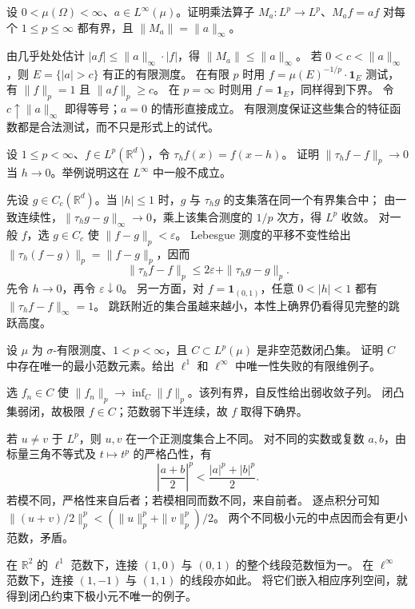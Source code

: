 \begin{exercise}\label{b1:ex:10-multiplication}
设 \(0<\mu(\Omega)<\infty\)、\(a\in L^\infty(\mu)\)。证明乘法算子
\(M_a:L^p\to L^p\)、\(M_af=af\) 对每个 \(1\leq p\leq\infty\) 都有界，且 \(\|M_a\|=\|a\|_\infty\)。
\end{exercise}
\begin{solution}
由几乎处处估计 \(|af|\leq\|a\|_\infty\cdot|f|\)，得 \(\|M_a\|\leq\|a\|_\infty\)。
若 \(0<c<\|a\|_\infty\)，则 \(E=\{|a|>c\}\) 有正的有限测度。
在有限 \(p\) 时用 \(f=\mu(E)^{-1/p}\cdot\mathbf1_E\) 测试，有 \(\|f\|_p=1\) 且 \(\|af\|_p\geq c\)。
在 \(p=\infty\) 时则用 \(f=\mathbf1_E\)，同样得到下界。
令 \(c\uparrow\|a\|_\infty\) 即得等号；\(a=0\) 的情形直接成立。
有限测度保证这些集合的特征函数都是合法测试，而不只是形式上的试代。
\end{solution}

\begin{exercise}\label{b1:ex:10-translation-continuity}
设 \(1\leq p<\infty\)、\(f\in L^p(\mathbb R^d)\)，令 \(\tau_hf(x)=f(x-h)\)。
证明 \(\|\tau_hf-f\|_p\to0\) 当 \(h\to0\)。举例说明这在 \(L^\infty\) 中一般不成立。
\end{exercise}
\begin{solution}
先设 \(g\in C_c(\mathbb R^d)\)。当 \(|h|\leq1\) 时，\(g\) 与 \(\tau_hg\) 的支集落在同一个有界集合中；
由一致连续性，\(\|\tau_hg-g\|_\infty\to0\)，乘上该集合测度的 \(1/p\) 次方，得 \(L^p\) 收敛。
对一般 \(f\)，选 \(g\in C_c\) 使 \(\|f-g\|_p<\varepsilon\)。
Lebesgue 测度的平移不变性给出 \(\|\tau_h(f-g)\|_p=\|f-g\|_p\)，因而
\[
 \|\tau_hf-f\|_p\leq2\varepsilon+\|\tau_hg-g\|_p.
\]
先令 \(h\to0\)，再令 \(\varepsilon\downarrow0\)。
另一方面，对 \(f=\mathbf1_{(0,1)}\)，任意 \(0<|h|<1\) 都有 \(\|\tau_hf-f\|_\infty=1\)。
跳跃附近的集合虽越来越小，本性上确界仍看得见完整的跳跃高度。
\end{solution}

\begin{exercise}\label{b1:ex:10-minimal-norm}
设 \(\mu\) 为 \(\sigma\)-有限测度、\(1<p<\infty\)，且 \(C\subset L^p(\mu)\) 是非空范数闭凸集。
证明 \(C\) 中存在唯一的最小范数元素。给出 \(\ell^1\) 和 \(\ell^\infty\) 中唯一性失败的有限维例子。
\end{exercise}
\begin{solution}
选 \(f_n\in C\) 使 \(\|f_n\|_p\to\inf_C\|f\|_p\)。该列有界，自反性给出弱收敛子列。
闭凸集弱闭，故极限 \(f\in C\)；范数弱下半连续，故 \(f\) 取得下确界。

若 \(u\ne v\) 于 \(L^p\)，则 \(u,v\) 在一个正测度集合上不同。
对不同的实数或复数 \(a,b\)，由标量三角不等式及 \(t\mapsto t^p\) 的严格凸性，有
\[
 \left|\frac{a+b}{2}\right|^p<\frac{|a|^p+|b|^p}{2}.
\]
若模不同，严格性来自后者；若模相同而数不同，来自前者。
逐点积分可知 \(\|(u+v)/2\|_p^p<(\|u\|_p^p+\|v\|_p^p)/2\)。
两个不同极小元的中点因而会有更小范数，矛盾。

在 \(\mathbb R^2\) 的 \(\ell^1\) 范数下，连接 \((1,0)\) 与 \((0,1)\) 的整个线段范数恒为一。
在 \(\ell^\infty\) 范数下，连接 \((1,-1)\) 与 \((1,1)\) 的线段亦如此。
将它们嵌入相应序列空间，就得到闭凸约束下极小元不唯一的例子。
\end{solution}

